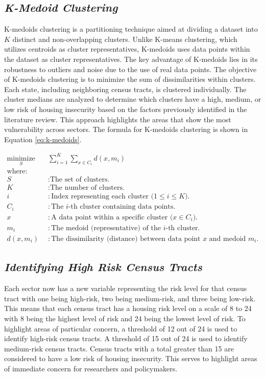 \subsection{\textit{K-Medoid Clustering}}
K-medoids clustering is a partitioning technique aimed at dividing a dataset into \(K\) distinct and non-overlapping clusters. Unlike K-means clustering, which utilizes centroids as cluster representatives, K-medoids uses data points within the dataset as cluster representatives. The key advantage of K-medoids lies in its robustness to outliers and noise due to the use of real data points. The objective of K-medoids clustering is to minimize the sum of dissimilarities within clusters. Each state, including neighboring census tracts, is clustered individually. The cluster medians are analyzed to determine which clusters have a high, medium, or low risk of housing insecurity based on the factors previously identified in the literature review. This approach highlights the areas that show the most vulnerability across sectors. The formula for K-medoids clustering is shown in Equation \ref{eq:k-medoids}.

\begin{equation}\label{eq:k-medoids}
    \begin{aligned}
        \underset{S}{\text{minimize}} \quad & \sum_{i=1}^{K} \sum_{x \in C_i} d(x, m_i) \\
        \text{where:} \\
        S & : \text{The set of clusters.} \\
        K & : \text{The number of clusters.} \\
        i & : \text{Index representing each cluster (\(1 \leq i \leq K\)).} \\
        C_i & : \text{The \(i\)-th cluster containing data points.} \\
        x & : \text{A data point within a specific cluster (\(x \in C_i\)).} \\
        m_i & : \text{The medoid (representative) of the \(i\)-th cluster.} \\
        d(x, m_i) & : \text{The dissimilarity (distance) between data point \(x\) and medoid \(m_i\).}
    \end{aligned}
\end{equation}


\subsection{\textit{Identifying High Risk Census Tracts}}
Each sector now has a new variable representing the risk level for that census tract with one being high-risk, two being medium-risk, and three being low-risk. This means that each census tract has a housing risk level on a scale of 8 to 24 with 8 being the highest level of risk and 24 being the lowest level of risk. To highlight areas of particular concern, a threshold of 12 out of 24 is used to identify high-risk census tracts. A threshold of 15 out of 24 is used to identify medium-risk census tracts. Census tracts with a total greater than 15 are considered to have a low risk of housing insecurity. This serves to highlight areas of immediate concern for researchers and policymakers. 

